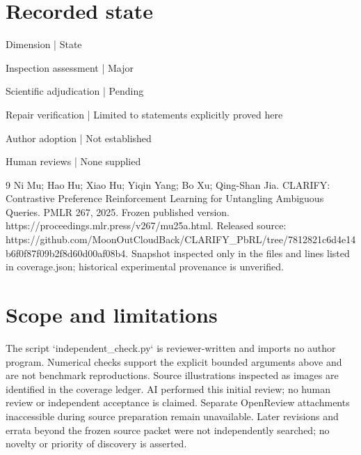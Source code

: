 \documentclass[10pt]{article}
\begin{document}
\section*{Recorded state}
Dimension | State\par
Inspection assessment | Major\par
Scientific adjudication | Pending\par
Repair verification | Limited to statements explicitly proved here\par
Author adoption | Not established\par
Human reviews | None supplied\par
9 Ni Mu; Hao Hu; Xiao Hu; Yiqin Yang; Bo Xu; Qing-Shan Jia. CLARIFY: Contrastive Preference Reinforcement Learning for Untangling Ambiguous Queries. PMLR 267, 2025. Frozen published version. https://proceedings.mlr.press/v267/mu25a.html. Released source: https://github.com/MoonOutCloudBack/CLARIFY\_PbRL/tree/7812821c6d4e14b6f0f87f09b2f8d60d00af08b4. Snapshot inspected only in the files and lines listed in coverage.json; historical experimental provenance is unverified.\par
\section*{Scope and limitations}
The script `independent\_check.py` is reviewer-written and imports no author program. Numerical checks support the explicit bounded arguments above and are not benchmark reproductions. Source illustrations inspected as images are identified in the coverage ledger. AI performed this initial review; no human review or independent acceptance is claimed. Separate OpenReview attachments inaccessible during source preparation remain unavailable. Later revisions and errata beyond the frozen source packet were not independently searched; no novelty or priority of discovery is asserted.\par
\end{document}
